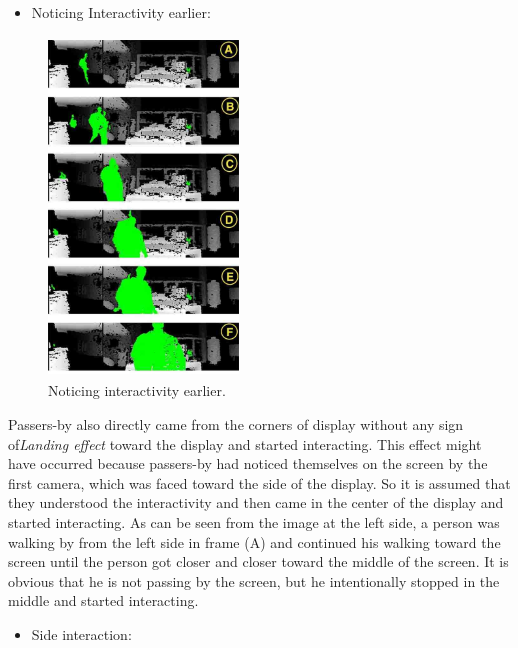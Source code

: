 \begin{itemize}
\item Noticing Interactivity earlier:
\end{itemize}


\begin{figure}
  \vspace{-30pt}
  \begin{center}
    \includegraphics[width=0.45\textwidth,height=90mm]{Figures/9/effects/noticing_earlier}
  \end{center}
  \vspace{-20pt}
  \caption{Noticing interactivity earlier.}
  \vspace{-60pt}
\end{figure}
Passers-by also directly came from the corners of display without any sign of\emph{Landing effect} toward the display and started interacting. This effect might have occurred because passers-by had noticed themselves on the screen by the first camera, which was faced toward the side of the display. So it is assumed that they understood the interactivity and then came in the center of the display and started interacting. As can be seen from the image at the left side, a person was walking by from the left side in frame (A) and continued his walking toward the screen until the person got closer and closer toward the middle of the screen. It is obvious that he is not passing by the screen, but he intentionally stopped in the middle and started interacting. 
\break


\begin{itemize}

\item Side interaction:

\end{itemize}


